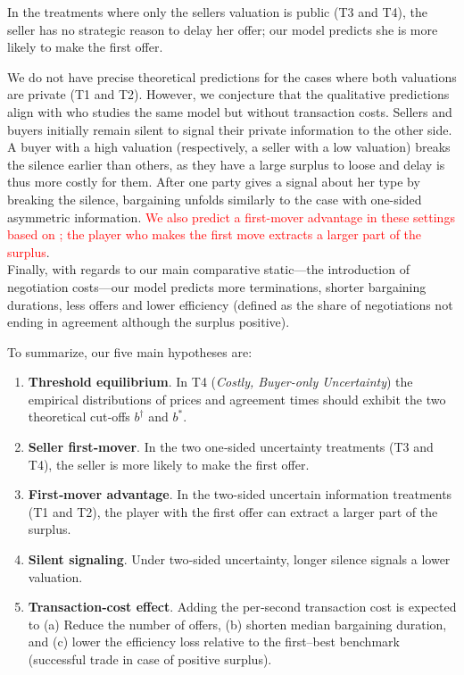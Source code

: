 In the treatments where only the sellers valuation is public (T3 and T4), the seller has no strategic reason to delay her offer; our model predicts she is more likely to make the first offer. 

We do not have precise theoretical predictions for the cases where both valuations are private (T1 and T2). However, we conjecture that the qualitative predictions align with \citet{cramton_strategic_1992} who studies the same model but without transaction costs. Sellers and buyers initially remain silent to signal their private information to the other side. A buyer with a high valuation (respectively, a seller with a low valuation) breaks the silence earlier than others, as they have a large surplus to loose and delay is thus more costly for them. After one party gives a signal about her type by breaking the silence, bargaining unfolds similarly to the case with one-sided asymmetric information. \textcolor{red}{We also predict a first-mover advantage in these settings based on \citep{rubinstein1982perfect}; the player who makes the first move extracts a larger part of the surplus}. \\

Finally, with regards to our main comparative static---the introduction of negotiation costs---our model predicts more terminations, shorter bargaining durations, less offers and lower efficiency (defined as the share of negotiations not ending in agreement although the surplus positive). 

To summarize, our five main hypotheses are:
\begin{enumerate}[label=\textbf{H\arabic*},leftmargin=1.4cm]
  \item \textbf{Threshold equilibrium}.  
        In T4 (\textit{Costly, Buyer-only Uncertainty}) the empirical distributions of prices and
        agreement times should exhibit the two theoretical cut‐offs
        \(b^{\dagger}\) and \(b^{*}\).
  \item \textbf{Seller first‐mover}.  
        In the two one‐sided uncertainty treatments (T3 and T4), the seller is more likely to make the first offer.
 \item \textbf{First‐mover advantage}.  
        In the two-sided uncertain information treatments (T1 and T2), the player with the first offer can extract a larger part of the surplus.
  \item \textbf{Silent signaling}.  
        Under two‐sided uncertainty, longer silence signals a lower valuation. 
  \item \textbf{Transaction‐cost effect}.  
        Adding the per‐second transaction cost is expected to (a) Reduce the number of offers,
        (b) shorten median bargaining duration, and (c) lower the efficiency
        loss relative to the first–best benchmark (successful trade in case of positive surplus).
\end{enumerate}

